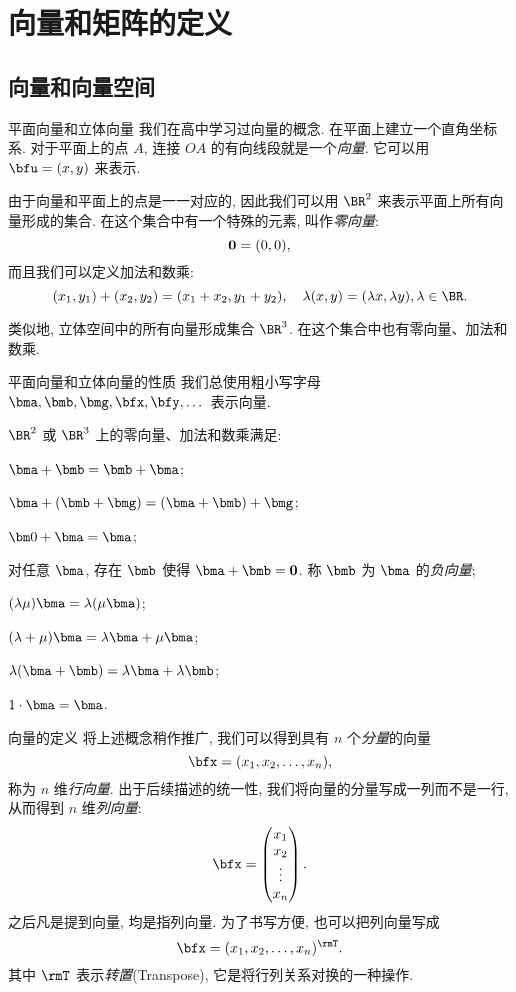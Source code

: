\section{向量和矩阵的定义}


\subsection{向量和向量空间}
\begin{frame}{平面向量和立体向量\noexer}
	\onslide<+->
	我们在高中学习过向量的概念.
	\onslide<+->
	在平面上建立一个直角坐标系. 对于平面上的点 $A$, 连接 $OA$ 的有向线段就是一个\emph{向量}.
	\onslide<+->
	它可以用 $\bfu=(x,y)$ 来表示.

	\onslide<+->
	由于向量和平面上的点是一一对应的, 因此我们可以用 $\BR^2$ 来表示平面上所有向量形成的集合.
	\onslide<+->
	在这个集合中有一个特殊的元素, 叫作\emph{零向量}:
	\[{\bf0}=(0,0),\]
	\onslide<+->
	而且我们可以定义加法和数乘:
	\[(x_1,y_1)+(x_2,y_2)=(x_1+x_2,y_1+y_2),\quad
	\lambda(x,y)=(\lambda x,\lambda y),\lambda\in\BR.\]

	\onslide<+->
	类似地, 立体空间中的所有向量形成集合 $\BR^3$.
	\onslide<+->
	在这个集合中也有零向量、加法和数乘.
\end{frame}


\begin{frame}{平面向量和立体向量的性质\noexer}
	\onslide<+->
	我们总使用粗小写字母 $\bma,\bmb,\bmg,\bfx,\bfy,\dots$ 表示向量.

	\onslide<+->
	$\BR^2$ 或 $\BR^3$ 上的零向量、加法和数乘满足:
	\begin{enumV}\bf
		\item $\bma+\bmb=\bmb+\bma$;\label{enum:V1}
		\item $\bma+(\bmb+\bmg)=(\bma+\bmb)+\bmg$;
		\item ${\bm0}+\bma=\bma$;
		\item 对任意 $\bma$, 存在 $\bmb$ 使得 $\bma+\bmb={\bf0}$. 称 $\bmb$ 为 $\bma$ 的\emph{负向量};
		\item $(\lambda\mu)\bma=\lambda(\mu\bma)$;
		\item $(\lambda+\mu)\bma=\lambda\bma+\mu\bma$;
		\item $\lambda(\bma+\bmb)=\lambda\bma+\lambda\bmb$;
		\item $1\cdot\bma=\bma$.\label{enum:V8}
	\end{enumV}
\end{frame}


\begin{frame}{向量的定义}
	\onslide<+->
	将上述概念稍作推广, 我们可以得到具有 $n$ 个\emph{分量}的向量
	\[\bfx=(x_1,x_2,\dots,x_n),\]
	称为 $n$ 维\emph{行向量}.
	\onslide<+->
	出于后续描述的统一性, 我们将向量的分量写成一列而不是一行, 从而得到 $n$ 维\emph{列向量}:
	\[\bfx=\begin{pmatrix}
		x_1\\
		x_2\\
		\vdots\\
		x_n
	\end{pmatrix}.\]
	\onslide<+->
	\alert{之后凡是提到向量, 均是指列向量}.
	\onslide<+->
	为了书写方便, 也可以把列向量写成
	\[\bfx=(x_1,x_2,\dots,x_n)^\rmT.\]
	其中 $\rmT$ 表示\emph{转置}(Transpose), 它是将行列关系对换的一种操作.
\end{frame}


